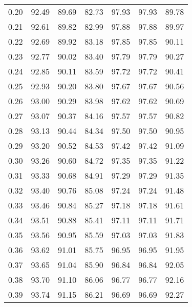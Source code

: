 \begin{tabular}{|c|c|c|c|c|c|c|}
      0.20 &     92.49 &     89.69 &      82.73 &   97.93 &      97.93 &         89.78 \\
      0.21 &     92.61 &     89.82 &      82.99 &   97.88 &      97.88 &         89.97 \\
      0.22 &     92.69 &     89.92 &      83.18 &   97.85 &      97.85 &         90.11 \\
      0.23 &     92.77 &     90.02 &      83.40 &   97.79 &      97.79 &         90.27 \\
      0.24 &     92.85 &     90.11 &      83.59 &   97.72 &      97.72 &         90.41 \\
      0.25 &     92.93 &     90.20 &      83.80 &   97.67 &      97.67 &         90.56 \\
      0.26 &     93.00 &     90.29 &      83.98 &   97.62 &      97.62 &         90.69 \\
      0.27 &     93.07 &     90.37 &      84.16 &   97.57 &      97.57 &         90.82 \\
      0.28 &     93.13 &     90.44 &      84.34 &   97.50 &      97.50 &         90.95 \\
      0.29 &     93.20 &     90.52 &      84.53 &   97.42 &      97.42 &         91.09 \\
      0.30 &     93.26 &     90.60 &      84.72 &   97.35 &      97.35 &         91.22 \\
      0.31 &     93.33 &     90.68 &      84.91 &   97.29 &      97.29 &         91.35 \\
      0.32 &     93.40 &     90.76 &      85.08 &   97.24 &      97.24 &         91.48 \\
      0.33 &     93.46 &     90.84 &      85.27 &   97.18 &      97.18 &         91.61 \\
      0.34 &     93.51 &     90.88 &      85.41 &   97.11 &      97.11 &         91.71 \\
      0.35 &     93.56 &     90.95 &      85.59 &   97.03 &      97.03 &         91.83 \\
      0.36 &     93.62 &     91.01 &      85.75 &   96.95 &      96.95 &         91.95 \\
      0.37 &     93.65 &     91.04 &      85.90 &   96.84 &      96.84 &         92.05 \\
      0.38 &     93.70 &     91.10 &      86.06 &   96.77 &      96.77 &         92.16 \\
      0.39 &     93.74 &     91.15 &      86.21 &   96.69 &      96.69 &         92.27 \\

\end{tabular}
